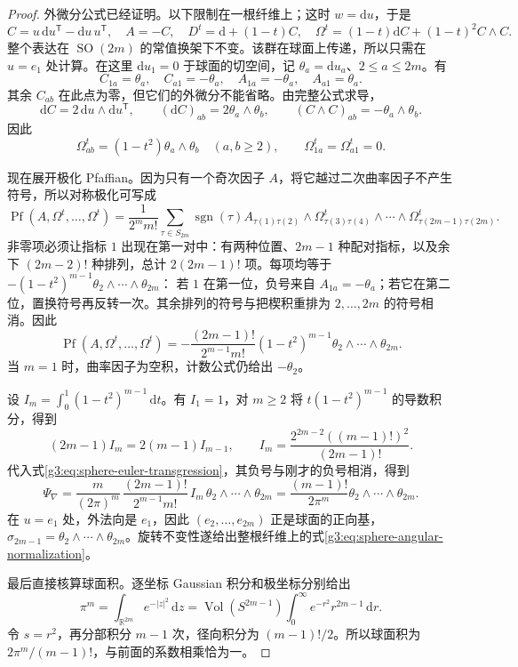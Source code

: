 \begin{proof}
	外微分公式已经证明。以下限制在一根纤维上；这时 \(w=\mathrm du\)，于是
	\[
		C=u\,\mathrm du^{\mathsf T}-\mathrm du\,u^{\mathsf T},
		\quad A=-C,\quad D^t=\mathrm d+(1-t)C,
		\quad \Omega^t=(1-t)\mathrm dC+(1-t)^2C\wedge C.
	\]
	整个表达在 \(\operatorname{SO}(2m)\) 的常值换架下不变。该群在球面上传递，所以只需在 \(u=e_1\) 处计算。在这里 \(\mathrm du_1=0\) 于球面的切空间，记 \(\theta_a=\mathrm du_a\)、\(2\le a\le2m\)。有
	\[
		C_{1a}=\theta_a,\quad C_{a1}=-\theta_a,\quad
		A_{1a}=-\theta_a,\quad A_{a1}=\theta_a.
	\]
	其余 \(C_{ab}\) 在此点为零，但它们的外微分不能省略。由完整公式求导，
	\[
		\mathrm dC=2\,\mathrm du\wedge\mathrm du^{\mathsf T},
		\qquad
		(\mathrm dC)_{ab}=2\theta_a\wedge\theta_b,
		\qquad
		(C\wedge C)_{ab}=-\theta_a\wedge\theta_b.
	\]
	因此
	\begin{equation}\label{g3:eq:angular-fiber-path-curvature}
		\Omega^t_{ab}=(1-t^2)\theta_a\wedge\theta_b
		\quad(a,b\ge2),\qquad
		\Omega^t_{1a}=\Omega^t_{a1}=0.
	\end{equation}

	现在展开极化 Pfaffian。因为只有一个奇次因子 \(A\)，将它越过二次曲率因子不产生符号，所以对称极化可写成
	\[
		\operatorname{Pf}(A,\Omega^t,\ldots,\Omega^t)
		=\frac1{2^m m!}\sum_{\tau\in S_{2m}}\operatorname{sgn}(\tau)
		A_{\tau(1)\tau(2)}
		\wedge\Omega^t_{\tau(3)\tau(4)}
		\wedge\cdots\wedge\Omega^t_{\tau(2m-1)\tau(2m)}.
	\]
	非零项必须让指标 \(1\) 出现在第一对中：有两种位置、\(2m-1\) 种配对指标，以及余下 \((2m-2)!\) 种排列，总计 \(2(2m-1)!\) 项。每项均等于
	\(- (1-t^2)^{m-1}\theta_2\wedge\cdots\wedge\theta_{2m}\)：
	若 \(1\) 在第一位，负号来自 \(A_{1a}=-\theta_a\)；若它在第二位，置换符号再反转一次。其余排列的符号与把楔积重排为 \(2,\ldots,2m\) 的符号相消。因此
	\[
		\operatorname{Pf}(A,\Omega^t,\ldots,\Omega^t)
		=-\frac{(2m-1)!}{2^{m-1}m!}(1-t^2)^{m-1}
		\theta_2\wedge\cdots\wedge\theta_{2m}.
	\]
	当 \(m=1\) 时，曲率因子为空积，计数公式仍给出 \(-\theta_2\)。

	设 \(I_m=\int_0^1(1-t^2)^{m-1}\,\mathrm dt\)。有 \(I_1=1\)，对 \(m\ge2\) 将 \(t(1-t^2)^{m-1}\) 的导数积分，得到
	\[
		(2m-1)I_m=2(m-1)I_{m-1},\qquad
		I_m=\frac{2^{2m-2}((m-1)!)^2}{(2m-1)!}.
	\]
	代入式\eqref{g3:eq:sphere-euler-transgression}，其负号与刚才的负号相消，得到
	\[
		\Psi_\nabla
		=\frac{m}{(2\pi)^m}\,
		\frac{(2m-1)!}{2^{m-1}m!}\,I_m\,
		\theta_2\wedge\cdots\wedge\theta_{2m}
		=\frac{(m-1)!}{2\pi^m}
		\theta_2\wedge\cdots\wedge\theta_{2m}.
	\]
	在 \(u=e_1\) 处，外法向是 \(e_1\)，因此 \((e_2,\ldots,e_{2m})\) 正是球面的正向基，\(\sigma_{2m-1}=\theta_2\wedge\cdots\wedge\theta_{2m}\)。旋转不变性遂给出整根纤维上的式\eqref{g3:eq:sphere-angular-normalization}。

	最后直接核算球面积。逐坐标 Gaussian 积分和极坐标分别给出
	\[
		\pi^m=\int_{\mathbb R^{2m}}e^{-|z|^2}\,\mathrm dz
		=\operatorname{Vol}(S^{2m-1})
		\int_0^\infty e^{-r^2}r^{2m-1}\,\mathrm dr.
	\]
	令 \(s=r^2\)，再分部积分 \(m-1\) 次，径向积分为 \((m-1)!/2\)。所以球面积为 \(2\pi^m/(m-1)!\)，与前面的系数相乘恰为一。
\end{proof}


